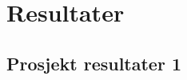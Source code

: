 \section{Resultater}\label{sec:Resultater}

\subsection{Prosjekt resultater 1}\label{sec:prosjekt resultat}


